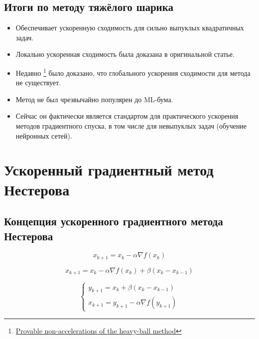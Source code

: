 \documentclass[
  russian,
  letterpaper,
  DIV=11,
  numbers=noendperiod]{scrartcl}
\providecommand{\tightlist}{%
  \setlength{\itemsep}{0pt}\setlength{\parskip}{0pt}}
\begin{document}
\subsection{Итоги по методу тяжёлого
шарика}\label{ux438ux442ux43eux433ux438-ux43fux43e-ux43cux435ux442ux43eux434ux443-ux442ux44fux436ux451ux43bux43eux433ux43e-ux448ux430ux440ux438ux43aux430}

\begin{itemize}
\tightlist
\item
  Обеспечивает ускоренную сходимость для сильно выпуклых квадратичных
  задач.
\item
  Локально ускоренная сходимость была доказана в оригинальной статье.
\item
  Недавно \footnote{\href{https://arxiv.org/pdf/2307.11291}{Provable
    non-accelerations of the heavy-ball method}} было доказано, что
  глобального ускорения сходимости для метода не существует.
\item
  Метод не был чрезвычайно популярен до ML-бума.
\item
  Сейчас он фактически является стандартом для практического ускорения
  методов градиентного спуска, в том числе для невыпуклых задач
  (обучение нейронных сетей).
\end{itemize}

\section{Ускоренный градиентный метод
Нестерова}\label{ux443ux441ux43aux43eux440ux435ux43dux43dux44bux439-ux433ux440ux430ux434ux438ux435ux43dux442ux43dux44bux439-ux43cux435ux442ux43eux434-ux43dux435ux441ux442ux435ux440ux43eux432ux430}

\subsection{Концепция ускоренного градиентного метода
Нестерова}\label{ux43aux43eux43dux446ux435ux43fux446ux438ux44f-ux443ux441ux43aux43eux440ux435ux43dux43dux43eux433ux43e-ux433ux440ux430ux434ux438ux435ux43dux442ux43dux43eux433ux43e-ux43cux435ux442ux43eux434ux430-ux43dux435ux441ux442ux435ux440ux43eux432ux430}

\[
x_{k+1} = x_k - \alpha \nabla f(x_k)
\]

\[
x_{k+1} = x_k - \alpha \nabla f(x_k) + \beta (x_k - x_{k-1})
\]

\[
\begin{cases}y_{k+1} = x_k + \beta (x_k - x_{k-1}) \\ x_{k+1} = y_{k+1} - \alpha \nabla f(y_{k+1}) \end{cases}
\]
\end{document}
